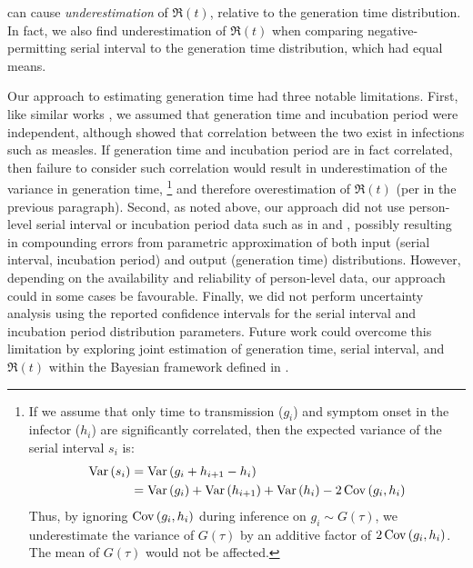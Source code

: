 can cause \emph{underestimation} of $\Re(t)$, relative to the generation time distribution.
In fact, we also find underestimation of $\Re(t)$ when comparing
negative-permitting serial interval to the generation time distribution,
which had equal means.
\par
Our approach to estimating generation time had three notable limitations.
First, like similar works \cite{Kuk2005,Ganyani2020}, we assumed that
generation time and incubation period were independent,
although \textcite{Klinkenberg2011} showed that
correlation between the two exist in infections such as measles.
If generation time and incubation period are in fact correlated, %
then failure to consider such correlation would result in
underestimation of the variance in generation time,%
\footnote{If we assume that only
  time to transmission ($g_i$) and symptom onset in the infector ($h_i$)
  are significantly correlated,
  then the expected variance of the serial interval $s_i$ is:
  \begin{align*}
  \mathop{\mathrm{Var}}{\left(s_i\right)}
  &= \mathop{\mathrm{Var}}{\left(g_i + h_{i+1} - h_i\right)}\\
  &= \mathop{\mathrm{Var}}{\left(g_i\right)} + \mathop{\mathrm{Var}}{\left(h_{i+1}\right)} + \mathop{\mathrm{Var}}{\left(h_i\right)}
     - 2 \mathop{\mathrm{Cov}}{\left(g_i,h_i\right)}
  \end{align*}
  Thus, by ignoring $\mathop{\mathrm{Cov}}{\left(g_i,h_i\right)}$ during inference on $g_i \sim G(\tau)$,
  we underestimate the variance of $G(\tau)$ by an additive factor of $2 \mathop{\mathrm{Cov}}{\left(g_i,h_i\right)}$.
  The mean of $G(\tau)$ would not be affected.}
and therefore overestimation of $\Re(t)$
(per \cite{Britton2019} in the previous paragraph).
Second, as noted above, our approach did not use
person-level serial interval or incubation period data
such as in \cite{Ganyani2020} and \cite{Klinkenberg2011},
possibly resulting in compounding errors from
parametric approximation of both input (serial interval, incubation period)
and output (generation time) distributions.
However, depending on the availability and reliability of person-level data,
our approach could in some cases be favourable.
Finally, we did not perform uncertainty analysis using
the reported confidence intervals for
the serial interval and incubation period distribution parameters.
Future work could overcome this limitation by exploring
joint estimation of generation time, serial interval, and $\Re(t)$
within the Bayesian framework defined in \cite{Cori2013}.